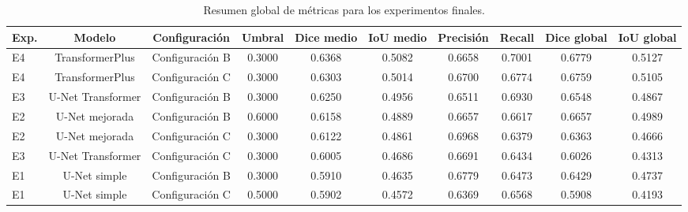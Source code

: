 \begin{table}[H]
    \centering
    \small
    \caption{Resumen global de métricas para los experimentos finales.}
    \label{tab:resumen_global_metricas}
    \begin{tabular}{lccccccccc}
        \toprule
        Exp. & Modelo & Configuración & Umbral & Dice medio & IoU medio & Precisión & Recall & Dice global & IoU global \\
        \midrule
        E4 & TransformerPlus & Configuración B & 0.3000 & 0.6368 & 0.5082 & 0.6658 & 0.7001 & 0.6779 & 0.5127 \\
        E4 & TransformerPlus & Configuración C & 0.3000 & 0.6303 & 0.5014 & 0.6700 & 0.6774 & 0.6759 & 0.5105 \\
        E3 & U-Net Transformer & Configuración B & 0.3000 & 0.6250 & 0.4956 & 0.6511 & 0.6930 & 0.6548 & 0.4867 \\
        E2 & U-Net mejorada & Configuración B & 0.6000 & 0.6158 & 0.4889 & 0.6657 & 0.6617 & 0.6657 & 0.4989 \\
        E2 & U-Net mejorada & Configuración C & 0.3000 & 0.6122 & 0.4861 & 0.6968 & 0.6379 & 0.6363 & 0.4666 \\
        E3 & U-Net Transformer & Configuración C & 0.3000 & 0.6005 & 0.4686 & 0.6691 & 0.6434 & 0.6026 & 0.4313 \\
        E1 & U-Net simple & Configuración B & 0.3000 & 0.5910 & 0.4635 & 0.6779 & 0.6473 & 0.6429 & 0.4737 \\
        E1 & U-Net simple & Configuración C & 0.5000 & 0.5902 & 0.4572 & 0.6369 & 0.6568 & 0.5908 & 0.4193 \\
        \bottomrule
    \end{tabular}
\end{table}

